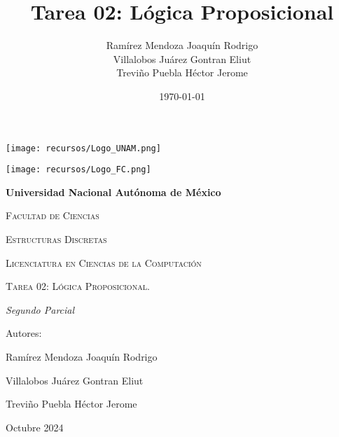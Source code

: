 \documentclass[oneside]{book}
\title{Tarea 02: Lógica Proposicional}
\author{Ramírez Mendoza Joaquín Rodrigo\\
Villalobos Juárez Gontran Eliut\\
Treviño Puebla Héctor Jerome}
\date{\today}
\begin{document}
\begin{titlepage}
	\begin{minipage}{3cm}
		\begin{center}
			\texttt{[image: recursos/Logo\_UNAM.png]}\par
		\end{center}
	\end{minipage}\hfill
	\begin{minipage}{10cm}

	\end{minipage}\hfill
	\begin{minipage}{3cm}
		\begin{center}
			\texttt{[image: recursos/Logo\_FC.png]}\par
		\end{center}
	\end{minipage}
	\centering
	\vspace{1cm}

	{\bfseries\LARGE Universidad Nacional Autónoma de México \par}

	\vspace{1cm}
	{\scshape\Large Facultad de Ciencias \par}
	\vspace{1cm}
	{\scshape\Large Estructuras Discretas \par}
	\vspace{1cm}
	{\scshape\Large Licenciatura en Ciencias de la Computación \par}
	\vspace{1cm}
	{\scshape\Huge Tarea 02: Lógica Proposicional.  \par}
	\vspace{3cm}
	{\itshape\Large Segundo Parcial \par}
	\vfill
	{\Large Autores: \par}
	{\Large Ramírez Mendoza Joaquín Rodrigo \par}
	{\Large Villalobos Juárez Gontran Eliut\par}
	{\Large Treviño Puebla Héctor Jerome \par}
	\vfill
	{\Large Octubre 2024 \par}
\end{titlepage}
\maketitle

\newpage




\newpage
\newpage
\end{document}
